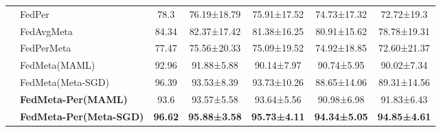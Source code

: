 \documentclass[oneside,a4paper,14pt]{extreport}
\begin{document}
\begin{table}[H]
{\begin{tabular}{c|l|ccccc}
    \multicolumn{1}{l|}{}                            & FedPer                                  & 78.3            & 76.19±18.79          & 75.91±17.52         & 74.73±17.32          & 72.72±19.3           \\
    \multicolumn{1}{l|}{}                            & FedAvgMeta                              & 84.34           & 82.37±17.42          & 81.38±16.25         & 80.91±15.62          & 78.78±19.31          \\
    \multicolumn{1}{l|}{}                            & FedPerMeta                              & 77.47           & 75.56±20.33          & 75.09±19.52         & 74.92±18.85          & 72.60±21.37          \\
    \multicolumn{1}{l|}{}                            & FedMeta(MAML)                           & 92.96           & 91.88±5.88           & 90.14±7.97          & 90.74±5.95           & 90.02±7.34           \\
    \multicolumn{1}{l|}{}                            & FedMeta(Meta-SGD)                       & 96.39           & 93.53±8.39           & 93.73±10.26         & 88.65±14.06          & 89.31±14.56          \\
    \multicolumn{1}{l|}{}                            & \textbf{\textbf{FedMeta-Per(MAML)}}     & 93.6            & 93.57±5.58           & 93.64±5.56          & 90.98±6.98           & 91.83±6.43           \\
    \multicolumn{1}{l|}{}                            & \textbf{\textbf{FedMeta-Per(Meta-SGD)}} & \textbf{96.62}  & \textbf{95.88±3.58}  & \textbf{95.73±4.11} & \textbf{94.34±5.05}  & \textbf{94.85±4.61}  \\
    \bottomrule
    \end{tabular}
    }
\end{table}
\end{document}
